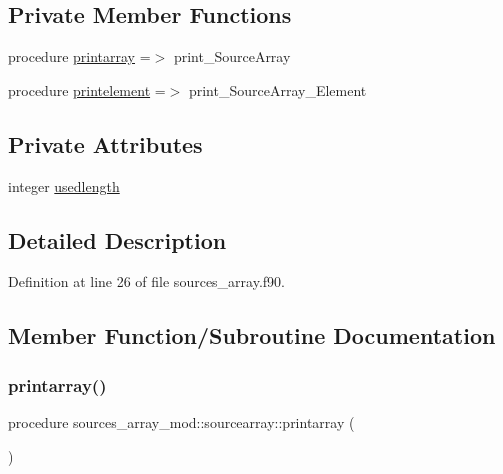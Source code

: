 \subsection*{Private Member Functions}
\begin{DoxyCompactItemize}
\item 
procedure \mbox{\hyperlink{structsources__array__mod_1_1sourcearray_a4200722231b4dfefa4f096b235d911e6}{printarray}} =$>$ print\+\_\+\+Source\+Array
\item 
procedure \mbox{\hyperlink{structsources__array__mod_1_1sourcearray_a72a537b29e5b5cf3ba35745cb7b41524}{printelement}} =$>$ print\+\_\+\+Source\+Array\+\_\+\+Element
\end{DoxyCompactItemize}
\subsection*{Private Attributes}
\begin{DoxyCompactItemize}
\item 
integer \mbox{\hyperlink{structsources__array__mod_1_1sourcearray_ad23c5d5462e36271240c333a9415190b}{usedlength}}
\end{DoxyCompactItemize}


\subsection{Detailed Description}


Definition at line 26 of file sources\+\_\+array.\+f90.



\subsection{Member Function/\+Subroutine Documentation}
\mbox{\label{structsources__array__mod_1_1sourcearray_a4200722231b4dfefa4f096b235d911e6}} 
\subsubsection{\texorpdfstring{printarray()}{printarray()}}
{\footnotesize\ttfamily procedure sources\+\_\+array\+\_\+mod\+::sourcearray\+::printarray (\begin{DoxyParamCaption}{ }\end{DoxyParamCaption})\hspace{0.3cm}{\ttfamily [private]}}



